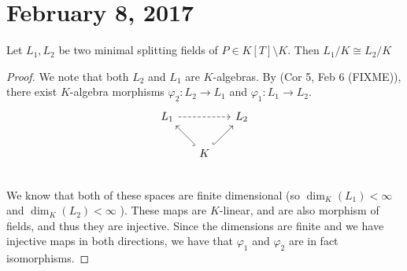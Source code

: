 \section{February 8, 2017}

\begin{prop} \label{Prop 1, Feb 8}
    Let $L_1, L_2$ be two minimal splitting fields of $P \in K[T] \setminus K$.
    Then $L_1 / K \cong L_2 / K$
\end{prop}

\begin{proof}
    We note that both $L_2$ and $L_1$ are $K$-algebras. By (Cor 5, Feb 6 (FIXME)),
    there exist $K$-algebra morphisms $\varphi_2: L_2 \rightarrow L_1$ and $\varphi_1: L_1 \rightarrow
    L_2$.
    \[
\begin{tikzcd}[,every arrow/.append style={maps to}
,every label/.append style={font=\normalsize},column sep=1.5em]
L_1  \arrow[rr, dashrightarrow] && L_2 \\
 & \arrow[ul, hook] K \arrow[ur, hook] \\
\end{tikzcd}
\]
We know that both of these spaces are finite dimensional (so $\dim_K(L_1) < \infty$
and $\dim_K(L_2) < \infty$ ). These maps are $K$-linear, and are also morphism
of fields, and thus they are injective. Since the dimensions are finite and we
have injective maps in both directions, we have that $\varphi_1$ and $\varphi_2$ are
in fact isomorphisms.
\end{proof}

